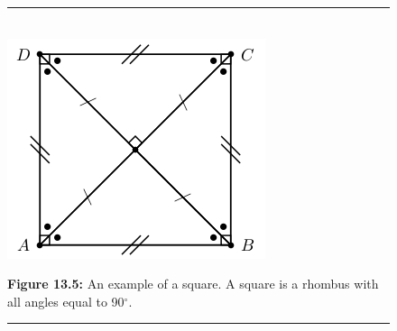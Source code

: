	\begin{figure}[H] %
    \begin{center}
    \rule[.1in]{\figurerulewidth}{.005in} \\
        \label{m39354*uid84!!!underscore!!!media}\label{m39354*uid84!!!underscore!!!printright prismsimage}\includegraphics{col11306.imgs/m39354_MG10C13_044.png} %
      \vspace{2pt}
    \vspace{\rubberspace}\par \begin{cnxcaption}
	  \small \textbf{Figure 13.5: }An example of a square. A square is a rhombus with all angles equal to 90\begin{math}{}^{\circ }\end{math}.
	\end{cnxcaption}
    \vspace{.1in}
    \rule[.1in]{\figurerulewidth}{.005in} \\
    \end{center}
 \end{figure}       
        \label{m39354*uid85}
